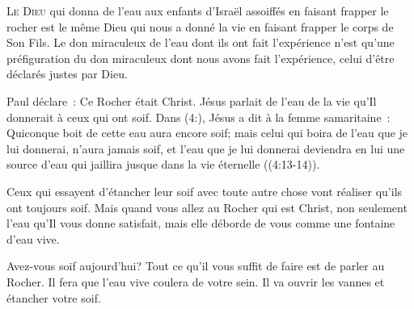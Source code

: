 

\lettrine{L}{e Dieu} qui donna de l'eau aux enfants d'Israël
 assoiffés en faisant frapper le rocher
 est le même Dieu qui nous a donné la vie
 en faisant frapper le corps de Son Fils.
 Le don miraculeux de l'eau dont ils ont fait l'expérience
 n'est qu'une préfiguration du don miraculeux
 dont nous avons fait l'expérience,
 celui d'être déclarés justes par Dieu.


Paul déclare~:
 \Og Ce Rocher était Christ. \Fg{}
 Jésus parlait de l'eau de la vie qu'Il donnerait
 à ceux qui ont soif. Dans (4:),
 Jésus a dit à la femme samaritaine~:
 \Og Quiconque boit de cette eau aura encore soif;
 mais celui qui boira de l'eau que je lui donnerai,
 n'aura jamais soif, et l'eau que je lui donnerai
 deviendra en lui une source d'eau qui jaillira
 jusque dans la vie éternelle \Fg{}
 ((4:13-14)).

Ceux qui essayent d'étancher leur soif
 avec toute autre chose vont réaliser qu'ils ont toujours soif.
 Mais quand vous allez au Rocher qui est Christ,
 non seulement l'eau qu'Il vous donne satisfait,
 mais elle déborde de vous comme une fontaine d'eau vive.

Avez-vous soif aujourd'hui?
 Tout ce qu'il vous suffit de faire est de parler au Rocher.
 Il fera que l'eau vive coulera de votre sein.
 Il va ouvrir les vannes et étancher votre soif.

\dvrule






